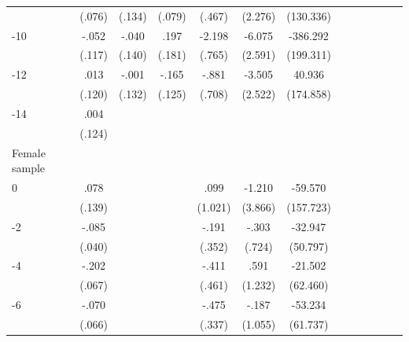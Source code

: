 \begin{table}[!ht]
\begin{adjustbox}{max width=\linewidth}
\begin{threeparttable}
{\begin{tabular}{l*{6}{S
S}}
                &   (.076)         &   (.134)         &   (.079)         &   (.467)         &  (2.276)         &(130.336)         \\
-10            &    -.052         &    -.040         &     .197         &   -2.198\sym{***}&   -6.075\sym{**} & -386.292\sym{*}  \\
                &   (.117)         &   (.140)         &   (.181)         &   (.765)         &  (2.591)         &(199.311)         \\
-12           &     .013         &    -.001         &    -.165         &    -.881         &   -3.505         &   40.936         \\
                &   (.120)         &   (.132)         &   (.125)         &   (.708)         &  (2.522)         &(174.858)         \\
-14           &     .004         &                  &                  &                  &                  &                  \\
                &   (.124)         &                  &                  &                  &                  &                  \\
\midrule
Female sample &&&&&&\\
0               &     .078         &         &         &     .099         &   -1.210         &  -59.570         \\
                &   (.139)         &         &         &  (1.021)         &  (3.866)         &(157.723)         \\
-2             &    -.085\sym{**} &         &         &    -.191         &    -.303         &  -32.947         \\
                &   (.040)         &         &         &   (.352)         &   (.724)         & (50.797)         \\
-4             &    -.202\sym{***}&         &         &    -.411         &     .591         &  -21.502         \\
                &   (.067)         &         &         &   (.461)         &  (1.232)         & (62.460)         \\
-6             &    -.070         &         &         &    -.475         &    -.187         &  -53.234         \\
                &   (.066)         &         &         &   (.337)         &  (1.055)         & (61.737)         \\

\end{tabular}}
\end{threeparttable}
\end{adjustbox}
\end{table}
